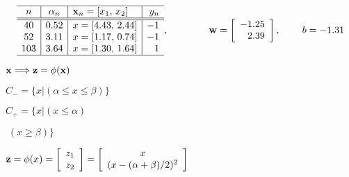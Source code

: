 \documentclass{article}
\def\lthtmlcheckvsize{\ifdim\ht\sizebox<\vsize 
  \ifdim\wd\sizebox<\hsize\expandafter\hfill\fi \expandafter\vfill
  \else\expandafter\vss\fi}%
\begin{document}
{\newpage\clearpage
{}%
\begin{displaymath}\begin{array}{c|c|l|r}\hline
n & \alpha_n & {\bf x}_n=[x_1,\,x_2] & y_n \\\hline\hline
    40 &  0.52 & x=[4.43,\, 2.44]  &	-1 \\
52 &  3.11 & x=[1.17,\, 0.74]  &	-1 \\
103 &  3.64 & x=[1.30,\, 1.64]  &	 1 \\\hline
\end{array},\;\;\;\;\;\;\;\;\;\;\;\;\;\;\;
  {\bf w}=\left[\begin{array}{r}-1.25\\2.39\end{array}\right],\;\;\;\;\;\;\;\;
b=-1.31\end{displaymath}%
\lthtmldisplayZ
\lthtmlcheckvsize\clearpage}

{\newpage\clearpage
{}%
$\displaystyle {\bf x} \Longrightarrow {\bf z}=\phi({\bf x})$%
\lthtmlindisplaymathZ
\lthtmlcheckvsize\clearpage}

{\newpage\clearpage
{}%
$ C_-=\{x\big|(\alpha\le x\le\beta)\}$%
\lthtmlindisplaymathZ
\lthtmlcheckvsize\clearpage}

{\newpage\clearpage
{}%
$ C_+=\{x\big|(x\le \alpha)\;$%
\lthtmlindisplaymathZ
\lthtmlcheckvsize\clearpage}

{\newpage\clearpage
{}%
$ \;(x\ge\beta)\}$%
\lthtmlindisplaymathZ
\lthtmlcheckvsize\clearpage}

{\newpage\clearpage
{}%
$\displaystyle {\bf z}=\phi(x)=\left[\begin{array}{l}z_1\\z_2\end{array}\right]
=\left[ \begin{array}{c} x \\(x-(\alpha+\beta)/2)^2 \end{array}\right]$%
\lthtmlindisplaymathZ
\lthtmlcheckvsize\clearpage}
\end{document}
